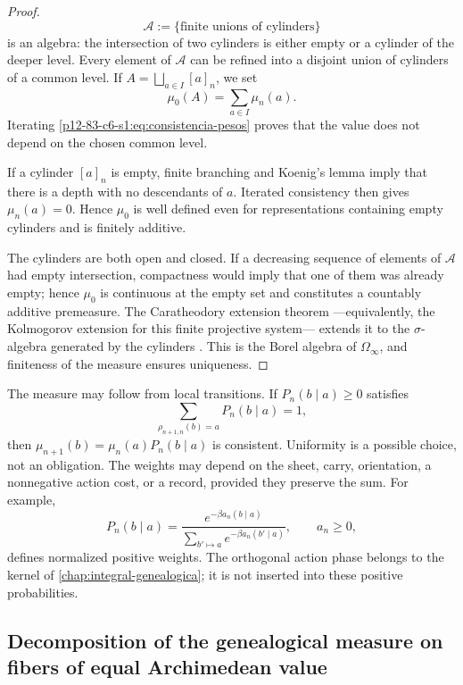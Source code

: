\begin{proof}
\[
 \mathscr A
 :=\{\text{finite unions of cylinders}\}
\]
is an algebra: the intersection of two cylinders is either empty or a cylinder of the
deeper level. Every element of \(\mathscr A\) can be refined into a
disjoint union of cylinders of a common level. If
\(A=\bigsqcup_{a\in I}[a]_n\), we set
\[
 \mu_0(A)=\sum_{a\in I}\mu_n(a).
\]
Iterating \eqref{p12-83-c6-s1:eq:consistencia-pesos} proves that the value does not depend on the
chosen common level.

If a cylinder \([a]_n\) is empty, finite branching and Koenig's lemma
\cite{Koenig1936}
imply that there is a depth with no descendants of \(a\). Iterated
consistency then gives \(\mu_n(a)=0\). Hence \(\mu_0\) is well
defined even for representations containing empty cylinders and is
finitely additive.

The cylinders are both open and closed. If a decreasing sequence of
elements of \(\mathscr A\) had empty intersection, compactness
would imply that one of them was already empty; hence \(\mu_0\) is continuous at
the empty set and constitutes a countably additive premeasure. The Caratheodory extension theorem ---equivalently, the Kolmogorov extension for this finite
projective system--- extends it to the \(\sigma\)-algebra generated by the
cylinders \cite{Caratheodory1914,Kolmogorov1933}. This is the Borel algebra of
\(\Omega_\infty\), and finiteness of the
measure ensures uniqueness.
\end{proof}

The measure may follow from local transitions. If
\(P_n(b\mid a)\ge0\) satisfies
\[
 \sum_{\rho_{n+1,n}(b)=a}P_n(b\mid a)=1,
\]
then
\(\mu_{n+1}(b)=\mu_n(a)P_n(b\mid a)\) is consistent. Uniformity is a
possible choice, not an obligation. The weights may depend on the sheet,
carry, orientation, a nonnegative action cost, or a record, provided
they preserve the sum. For example,
\[
 P_n(b\mid a)
 =\frac{e^{-\beta a_n(b\mid a)}}
        {\sum_{b'\mapsto a}e^{-\beta a_n(b'\mid a)}},
 \qquad a_n\geq0,
\]
defines normalized positive weights. The orthogonal action phase belongs to the
kernel of \cref{chap:integral-genealogica}; it is not inserted into these
positive probabilities.

\subsection{Decomposition of the genealogical measure on fibers of equal Archimedean value}

